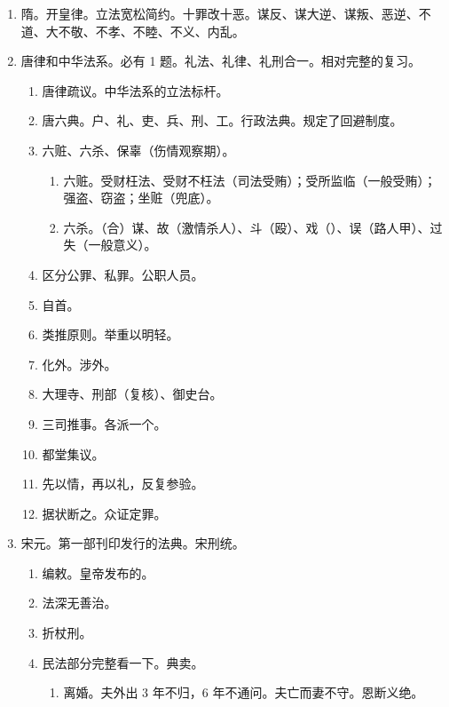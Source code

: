 \begin{enumerate}
\begin{enumerate}
          \item 大理寺（审判）、御史台（监察）。
        \end{enumerate}
  \item 隋。开皇律。立法宽松简约。十罪改十恶。谋反、谋大逆、谋叛、恶逆、不道、大不敬、不孝、不睦、不义、内乱。
  \item 唐律和中华法系。必有 1 题。礼法、礼律、礼刑合一。相对完整的复习。
        \begin{enumerate}
          \item 唐律疏议。中华法系的立法标杆。
          \item 唐六典。户、礼、吏、兵、刑、工。行政法典。规定了回避制度。
          \item 六赃、六杀、保辜（伤情观察期）。
                \begin{enumerate}
                  \item 六赃。受财枉法、受财不枉法（司法受贿）；受所监临（一般受贿）；强盗、窃盗；坐赃（兜底）。
                  \item 六杀。（合）谋、故（激情杀人）、斗（殴）、戏（）、误（路人甲）、过失（一般意义）。
                \end{enumerate}
          \item 区分公罪、私罪。公职人员。
          \item 自首。
          \item 类推原则。举重以明轻。
          \item 化外。涉外。
          \item 大理寺、刑部（复核）、御史台。
          \item 三司推事。各派一个。
          \item 都堂集议。
          \item 先以情，再以礼，反复参验。
          \item 据状断之。众证定罪。
        \end{enumerate}
  \item 宋元。第一部刊印发行的法典。宋刑统。
        \begin{enumerate}
          \item 编敕。皇帝发布的。
          \item 法深无善治。
          \item 折杖刑。
          \item 民法部分完整看一下。典卖。
                \begin{enumerate}
                  \item 离婚。夫外出 3 年不归，6 年不通问。夫亡而妻不守。恩断义绝。

\end{enumerate}
\end{enumerate}
\end{enumerate}

